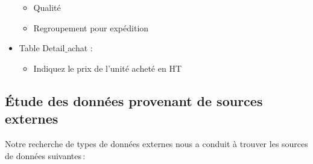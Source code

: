 \begin{itemize}[label=\textbullet, font=\LARGE \color{listGreen}]
\begin{itemize}[label=\textbullet, font=\LARGE \color{listGrey}]
		\item Qualité  

		\item Regroupement pour expédition 
	\end{itemize}


\item Table Detail$\_$achat : 

	\begin{itemize}[label=\textbullet, font=\LARGE \color{listGrey}]
		\item Indiquez le prix de l’unité acheté en HT 
	\end{itemize}


\end{itemize}

   

\subsection{Étude des données provenant de sources externes}  

Notre recherche de types de données externes nous a conduit à trouver les sources de données suivantes :  

